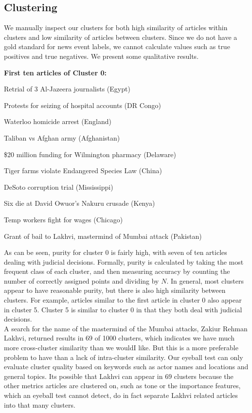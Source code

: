 
\subsection{Clustering}

We manually inspect our clusters for both high similarity of articles within clusters and low similarity of articles between clusters. Since we do not have a gold standard for news event labels, we cannot calculate values such as true positives and true negatives. We present some qualitative results.

\textbf{First ten articles of Cluster 0:}  
\begin{compactenum}
	\item Retrial of 3 Al-Jazeera journalists (Egypt)
	\item Protests for seizing of hospital accounts (DR Congo)
	\item Waterloo homicide arrest (England)
	\item Taliban vs Afghan army (Afghanistan)
	\item \$20 million funding for Wilmington pharmacy (Delaware)
	\item Tiger farms violate Endangered Species Law (China)
	\item DeSoto corruption trial (Mississippi)
	\item Six die at David Owuor's Nakuru crusade (Kenya)
	\item Temp workers fight for wages (Chicago)
	\item Grant of bail to Lakhvi, mastermind of Mumbai attack (Pakistan)
\end{compactenum}

As can be seen, purity for cluster 0 is fairly high, with seven of ten articles dealing with judicial decisions. Formally, purity is calculated by taking the most frequent class of each cluster, and then measuring accuracy by counting the number of correctly assigned points and dividing by $N$. In general, most clusters appear to have reasonable purity, but there is also high similarity between clusters. For example, articles similar to the first article in cluster 0 also appear in cluster 5. Cluster 5 is similar to cluster 0 in that they both deal with judicial decisions.\\

\noindent A search for the name of the mastermind of the Mumbai attacks, Zakiur Rehman Lakhvi, returned results in 69 of 1000 clusters, which indicates we have much more cross-cluster similarity than we wouldI like. But this is a more preferable problem to have than a lack of intra-cluster similarity. Our eyeball test can only evaluate cluster quality based on keywords such as actor names and locations and general topics. Its possible that Lakhvi can appear in 69 clusters because the other metrics articles are clustered on, such as tone or the importance features, which an eyeball test cannot detect, do in fact separate Lakhvi related articles into that many clusters.

